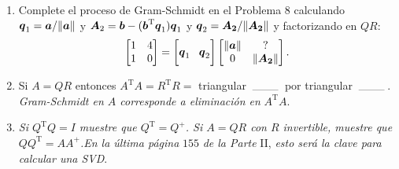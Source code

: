 \documentclass[12pt,a4paper]{article}
\newcommand{\bi}[1]{\hbox{\boldmath$#1$}}
\newcommand\1{\mbox{\,\vrule height-0.8pt depth1.0pt width2pc\,}}
\newcommand\2{\mbox{\,\vrule height-0.8pt depth1.0pt width1pc\,}}
\DeclareRobustCommand\transp{^{\mathrm{T}}}
\begin{document}
\begin{enumerate}
\item Complete el proceso de Gram-Schmidt en el Problema $8$ calculando
   $\bi{q}_1=\bi{a}/\|\bi{a}\|$ y $\bi{A}_2=\bi{b}-(\bi{b}\transp\bi{q}_1)\bi{q}_1$ y $\bi{q}_2=\bi{A_2}/
  \|\bi{A_2}\|$ y factorizando en $QR$:
\begin{displaymath}
  \begin{bmatrix} 1 & 4\\ 1 & 0\end{bmatrix}=
  \left[\vphantom{\begin{bmatrix} 1\\ 4\end{bmatrix}}
    \bi{q}_1\quad \bi{q}_2\right]
  \begin{bmatrix}
    \|\bi{a}\| & ?        \\
    0 & \|\bi{A_2}\| \end{bmatrix}.
\end{displaymath}
\item Si $A=QR$ entonces $A\transp A=R\transp R=$ triangular $\1$ por triangular $\1$.\break
\emph{Gram-Schmidt en $A$ corresponde a eliminación en} $A\transp A$.

\item \emph{Si $Q\transp Q\!=\!I$ muestre que $Q\transp\!=\!Q^+$. Si $A\!=\!QR$ con $R$ invertible, muestre que $QQ\transp\!=\!AA^+$.\linebreak En la última página} $155$ \emph{de la Parte} II, \emph{esto ser\'a la clave para calcular una SVD}.

\newpage
\noindent


\end{enumerate}
\end{document}
